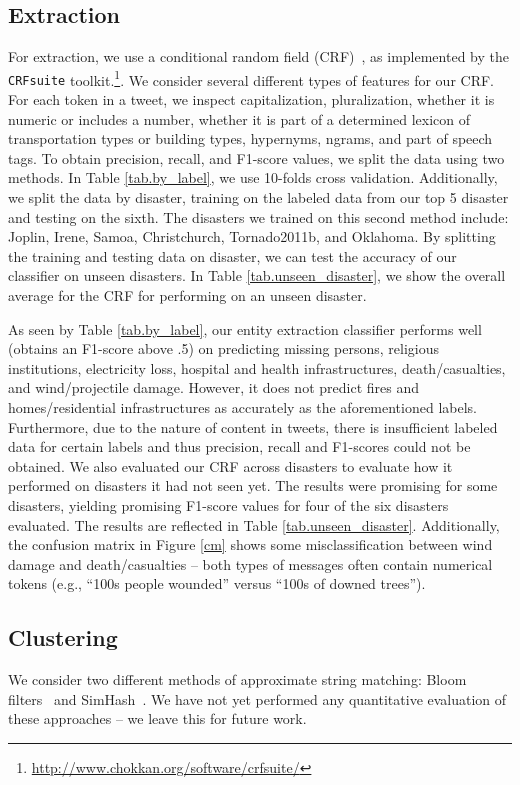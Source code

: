 \documentclass{article}
\begin{document}
\subsection{Extraction}
For extraction, we use a conditional random field (CRF)~\cite{sutton12intro}, as
implemented by the {\tt CRFsuite}
toolkit.\footnote{\url{http://www.chokkan.org/software/crfsuite/}}. We consider several different types of features for our CRF. For each token in a tweet, we inspect capitalization, pluralization, whether it is numeric or includes a number, whether it is part of a determined lexicon of transportation types or building types, hypernyms, ngrams, and part of speech tags. 
To obtain precision, recall, and F1-score values, we split the data using two methods. In Table \ref{tab.by_label}, we use 10-folds cross validation. Additionally, we split the data by disaster, training on the labeled data from our top 5 disaster and testing on the sixth. The disasters we trained on this second method include: Joplin, Irene, Samoa, Christchurch, Tornado2011b, and Oklahoma. By splitting the training and testing data on disaster, we can test the accuracy of our classifier on unseen disasters. In Table \ref{tab.unseen_disaster}, we show the overall average for the CRF for performing on an unseen disaster.

As seen by Table \ref{tab.by_label}, our entity extraction classifier performs well (obtains an F1-score above .5) on predicting missing persons, religious institutions, electricity loss, hospital and health infrastructures, death/casualties, and wind/projectile damage. However, it does not predict fires and homes/residential infrastructures as accurately as the aforementioned labels. Furthermore, due to the nature of content in tweets, there is insufficient labeled data for certain labels and thus precision, recall and F1-scores could not be obtained.
We also evaluated our CRF across disasters to evaluate how it performed on disasters it had not seen yet. The results were promising for some disasters, yielding promising F1-score values for four of the six disasters evaluated. The results are reflected in Table \ref{tab.unseen_disaster}. Additionally, the confusion matrix in Figure \ref{cm} shows some misclassification between wind damage and death/casualties -- both types of messages often contain numerical tokens (e.g., ``100s people wounded'' versus ``100s of downed trees'').


\subsection{Clustering}
We consider two different methods of approximate string matching: Bloom
filters~\cite{bloom70space} and SimHash~\cite{charikar02similarity}. We have
not yet performed any quantitative evaluation of these approaches -- we leave this
for future work.
\end{document}

